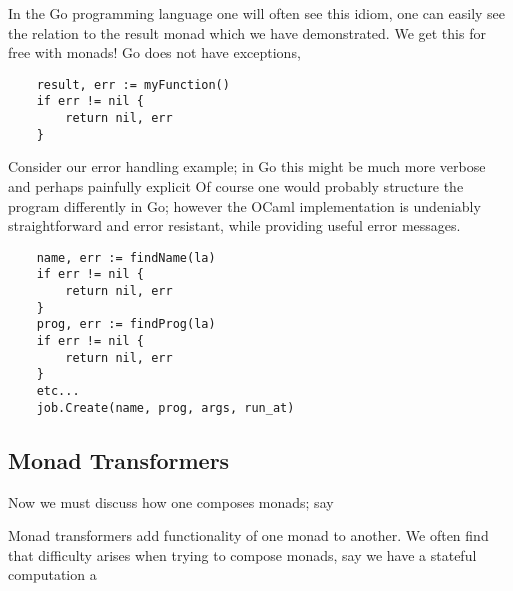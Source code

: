 In the Go programming language one will often see this idiom,
one can easily see the relation to the result monad which we
have demonstrated.
We get this for free with monads!
Go does not have exceptions,

\begin{verbatim}
    result, err := myFunction()
    if err != nil {
        return nil, err
    }
\end{verbatim}

Consider our error handling example;
in Go this might be much more verbose
and perhaps painfully explicit
Of course one would probably structure the program differently in Go;
however the OCaml implementation is undeniably straightforward
and error resistant, while providing useful error messages.

\begin{verbatim}
    name, err := findName(la)
    if err != nil {
        return nil, err
    }
    prog, err := findProg(la)
    if err != nil {
        return nil, err
    }
    etc...
    job.Create(name, prog, args, run_at)
\end{verbatim}

\subsection{Monad Transformers}
Now we must discuss how one composes monads;
say

Monad transformers add functionality of one monad to another.
We often find that difficulty arises when trying to compose monads,
say we have a stateful computation a
\cite{king1993combining}
